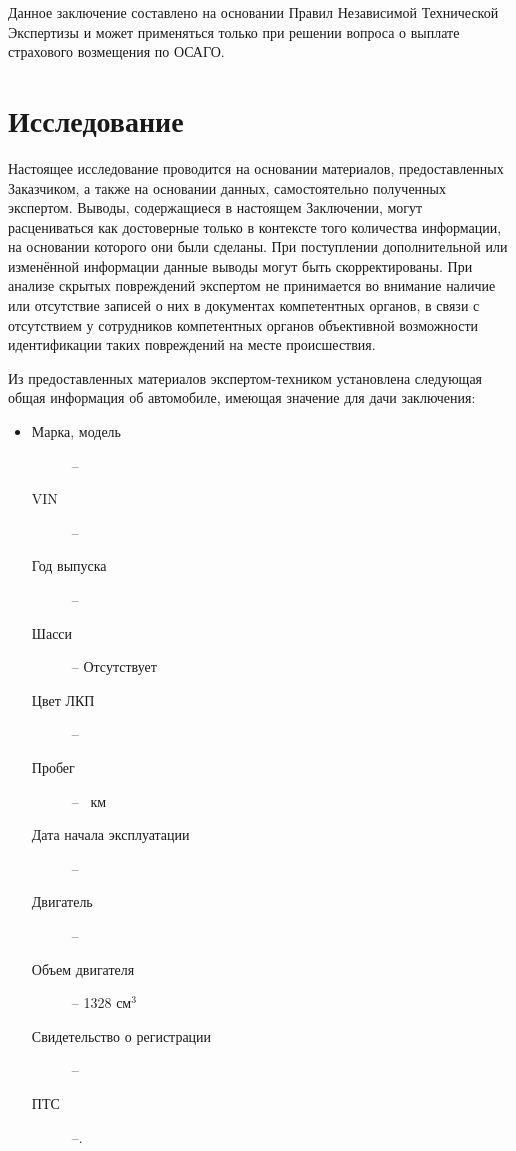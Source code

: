 Данное заключение составлено на основании Правил Независимой Технической Экспертизы и может применяться только при решении вопроса о выплате страхового возмещения по ОСАГО.


\section{Исследование}

      Настоящее исследование проводится на основании материалов, предоставленных Заказчиком, а также на основании данных, самостоятельно полученных экспертом. Выводы, содержащиеся в настоящем Заключении, могут расцениваться как достоверные только в контексте того количества информации, на основании которого они были сделаны. При поступлении дополнительной или изменённой информации данные выводы могут быть
скорректированы. При анализе скрытых повреждений экспертом не принимается во внимание наличие или отсутствие записей о них в документах компетентных органов, в связи с отсутствием у сотрудников компетентных органов объективной возможности  идентификации таких повреждений на месте происшествия.

	\par Из предоставленных материалов   экспертом-техником установлена следующая общая информация об автомобиле, имеющая значение для дачи заключения:\\
 \parbox[]{10cm}{}
\begin{itemize}
	\item[ ] 
	\begin{description}
		\item[Марка, модель] -- 
		\item[VIN] -- \vin
		\item[Год выпуска] -- 
		\item[Шасси] -- Отсутствует
		\item[Цвет ЛКП] -- 
		\item[Пробег] --  \, км %
		\item[Дата начала эксплуатации] -- 
		\item[Двигатель] -- 
		\item[Объем двигателя] -- 1328 $ \text{см}^3 $
		\item[Свидетельство о регистрации] -- 
		\item[ПТС] --.	
	\end{description}
\end{itemize}

